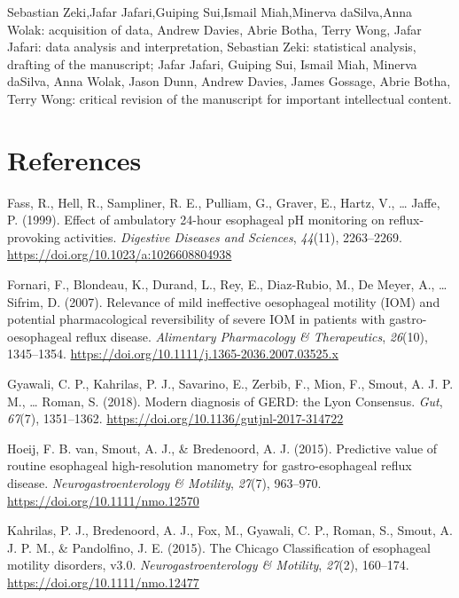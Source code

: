 \documentclass[english,man,floatsintext]{apa6}
\begin{document}
Sebastian Zeki,Jafar Jafari,Guiping Sui,Ismail Miah,Minerva daSilva,Anna Wolak: acquisition of data, Andrew Davies, Abrie Botha, Terry Wong, Jafar Jafari: data analysis and interpretation, Sebastian Zeki: statistical analysis, drafting of the manuscript; Jafar Jafari, Guiping Sui, Ismail Miah, Minerva daSilva, Anna Wolak, Jason Dunn, Andrew Davies, James Gossage, Abrie Botha, Terry Wong: critical revision of the manuscript for important intellectual content.

\hypertarget{references}{%
\section{References}\label{references}}

\begingroup
\setlength{\parindent}{-0.5in}
\setlength{\leftskip}{0.5in}

\hypertarget{refs}{}
\leavevmode\hypertarget{ref-Fass1999}{}%
Fass, R., Hell, R., Sampliner, R. E., Pulliam, G., Graver, E., Hartz, V., \ldots{} Jaffe, P. (1999). Effect of ambulatory 24-hour esophageal pH monitoring on reflux-provoking activities. \emph{Digestive Diseases and Sciences}, \emph{44}(11), 2263--2269. \url{https://doi.org/10.1023/a:1026608804938}

\leavevmode\hypertarget{ref-FORNARI2007}{}%
Fornari, F., Blondeau, K., Durand, L., Rey, E., Diaz-Rubio, M., De Meyer, A., \ldots{} Sifrim, D. (2007). Relevance of mild ineffective oesophageal motility (IOM) and potential pharmacological reversibility of severe IOM in patients with gastro-oesophageal reflux disease. \emph{Alimentary Pharmacology \& Therapeutics}, \emph{26}(10), 1345--1354. \url{https://doi.org/10.1111/j.1365-2036.2007.03525.x}

\leavevmode\hypertarget{ref-Gyawali2018}{}%
Gyawali, C. P., Kahrilas, P. J., Savarino, E., Zerbib, F., Mion, F., Smout, A. J. P. M., \ldots{} Roman, S. (2018). Modern diagnosis of GERD: the Lyon Consensus. \emph{Gut}, \emph{67}(7), 1351--1362. \url{https://doi.org/10.1136/gutjnl-2017-314722}

\leavevmode\hypertarget{ref-VanHoeij2015}{}%
Hoeij, F. B. van, Smout, A. J., \& Bredenoord, A. J. (2015). Predictive value of routine esophageal high-resolution manometry for gastro-esophageal reflux disease. \emph{Neurogastroenterology \& Motility}, \emph{27}(7), 963--970. \url{https://doi.org/10.1111/nmo.12570}

\leavevmode\hypertarget{ref-Kahrilas2015}{}%
Kahrilas, P. J., Bredenoord, A. J., Fox, M., Gyawali, C. P., Roman, S., Smout, A. J. P. M., \& Pandolfino, J. E. (2015). The Chicago Classification of esophageal motility disorders, v3.0. \emph{Neurogastroenterology \& Motility}, \emph{27}(2), 160--174. \url{https://doi.org/10.1111/nmo.12477}
\end{document}
